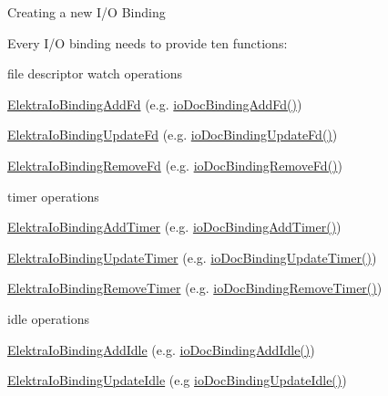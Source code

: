 \begin{DoxyParagraph}{Creating a new I/O Binding}

\end{DoxyParagraph}
Every I/O binding needs to provide ten functions\+:
\begin{DoxyItemize}
\item file descriptor watch operations
\begin{DoxyItemize}
\item \mbox{\hyperlink{kdbio_8h_addbfc876a15d0b8864196c67ab3e5a26}{Elektra\+Io\+Binding\+Add\+Fd}} (e.\+g. \mbox{\hyperlink{io__doc_8c_ae9b5f4e891829f3af8563e8160e1bd02}{io\+Doc\+Binding\+Add\+Fd()}})
\item \mbox{\hyperlink{kdbio_8h_acdb75b8df54c2b64980cf541b2704f37}{Elektra\+Io\+Binding\+Update\+Fd}} (e.\+g. \mbox{\hyperlink{io__doc_8c_a172a781f21310745a16cb24c578c4656}{io\+Doc\+Binding\+Update\+Fd()}})
\item \mbox{\hyperlink{kdbio_8h_af1d03ff367130892ec3d1f4788eb8277}{Elektra\+Io\+Binding\+Remove\+Fd}} (e.\+g. \mbox{\hyperlink{io__doc_8c_ac5a985c3d54b2c06838d8af1719fcf09}{io\+Doc\+Binding\+Remove\+Fd()}})
\end{DoxyItemize}
\item timer operations
\begin{DoxyItemize}
\item \mbox{\hyperlink{kdbio_8h_a61a8f37e371b8360c92222f58f4691eb}{Elektra\+Io\+Binding\+Add\+Timer}} (e.\+g. \mbox{\hyperlink{io__doc_8c_a4392a7bfa23513cf4cff7bcf4b0c4c68}{io\+Doc\+Binding\+Add\+Timer()}})
\item \mbox{\hyperlink{kdbio_8h_ab50f6288380aba507d27a0d66e00d8b4}{Elektra\+Io\+Binding\+Update\+Timer}} (e.\+g. \mbox{\hyperlink{io__doc_8c_a1ed16f0e61d2c7c59735b321b7080dec}{io\+Doc\+Binding\+Update\+Timer()}})
\item \mbox{\hyperlink{kdbio_8h_a00c0ffb60386fd65869367280d1ffe62}{Elektra\+Io\+Binding\+Remove\+Timer}} (e.\+g. \mbox{\hyperlink{io__doc_8c_afc27d1f174e30aab500a9e94a366f8ec}{io\+Doc\+Binding\+Remove\+Timer()}})
\end{DoxyItemize}
\item idle operations
\begin{DoxyItemize}
\item \mbox{\hyperlink{kdbio_8h_adcfdf9f514441cabfbfd064fe4021522}{Elektra\+Io\+Binding\+Add\+Idle}} (e.\+g. \mbox{\hyperlink{io__doc_8c_ae7db8c833350176d2570cc4a010c2692}{io\+Doc\+Binding\+Add\+Idle()}})
\item \mbox{\hyperlink{kdbio_8h_af4fa5e05e59022b5d5421932882fc966}{Elektra\+Io\+Binding\+Update\+Idle}} (e.\+g \mbox{\hyperlink{io__doc_8c_a9b8faf0861123676a0a826987962552f}{io\+Doc\+Binding\+Update\+Idle()}})

\end{DoxyItemize}
\end{DoxyItemize}
